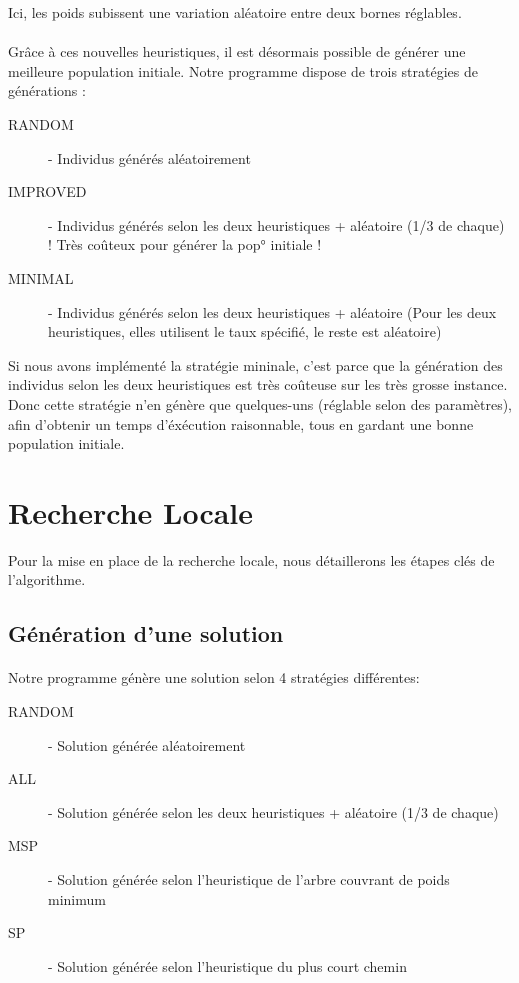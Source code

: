 	Ici, les poids subissent une variation aléatoire entre deux bornes réglables.

	\paragraph{}Grâce à ces nouvelles heuristiques, il est désormais possible de générer une meilleure population initiale. Notre programme
dispose de trois stratégies de générations :
	\begin{description}
	\item[RANDOM]	- Individus générés aléatoirement
	\item[IMPROVED] - Individus générés selon les deux heuristiques + aléatoire (1/3 de chaque) ! Très coûteux pour générer la pop° initiale !
	\item[MINIMAL]  - Individus générés selon les deux heuristiques + aléatoire (Pour les deux heuristiques, elles utilisent le taux spécifié, le reste est aléatoire)
	\end{description}

	Si nous avons implémenté la stratégie mininale, c'est parce que la génération des individus selon les deux heuristiques est très coûteuse sur les très grosse instance. Donc cette
stratégie n'en génère que quelques-uns (réglable selon des paramètres), afin d'obtenir un temps d'éxécution raisonnable, tous en gardant une bonne population initiale.
    
\newpage
\section{Recherche Locale}

	Pour la mise en place de la recherche locale, nous détaillerons les étapes clés de l'algorithme.

	\subsection{Génération d'une solution}

		\paragraph{} Notre programme génère une solution selon 4 stratégies différentes:

	\begin{description}
	\item[RANDOM]	- Solution générée aléatoirement
	\item[ALL]		- Solution générée selon les deux heuristiques + aléatoire (1/3 de chaque)
	\item[MSP]		- Solution générée selon l'heuristique de l'arbre couvrant de poids minimum
	\item[SP]		- Solution générée selon l'heuristique du plus court chemin
	\end{description}

